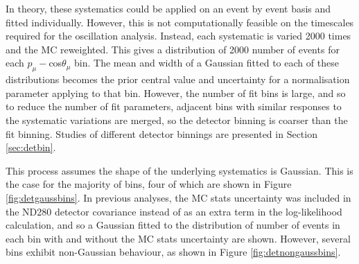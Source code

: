 In theory, these systematics could be applied on an event by event basis and fitted individually. However, this is not computationally feasible on the timescales required for the oscillation analysis. Instead, each systematic is varied 2000 times and the MC reweighted. This gives a distribution of 2000 number of events for each $p_{\mu}-$cos$\theta_{\mu}$ bin. The mean and width of a Gaussian fitted to each of these distributions becomes the prior central value and uncertainty for a normalisation parameter applying to that bin. However, the number of fit bins is large, and so to reduce the number of fit parameters, adjacent bins with similar responses to the systematic variations are merged, so the detector binning is coarser than the fit binning. Studies of different detector binnings are presented in Section \ref{sec:detbin}.

This process assumes the shape of the underlying systematics is Gaussian. This is the case for the majority of bins, four of which are shown in Figure \ref{fig:detgaussbins}. In previous analyses, the MC stats uncertainty was included in the ND280 detector covariance instead of as an extra term in the log-likelihood calculation, and so a Gaussian fitted to the distribution of number of events in each bin with and without the MC stats uncertainty are shown. However, several bins exhibit non-Gaussian behaviour, as shown in Figure \ref{fig:detnongaussbins}.

